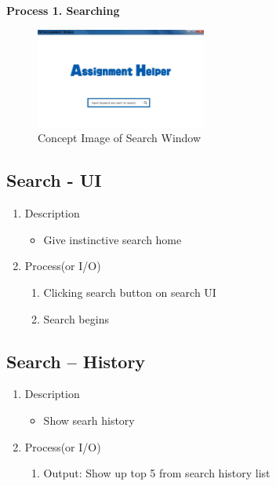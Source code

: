 \documentclass[conference]{IEEEtran}
\begin{document}
\textbf{Process 1. Searching}


\textit{}
\begin{figure}[h]
\centering
\includegraphics[width=0.5\textwidth]{./figures/UI_main.jpg}
\caption{Concept Image of Search Window}
\label{fig_concept_main}
\end{figure}


\subsection{Search - UI}
\begin{enumerate}
\item Description
\begin{itemize}
   \item Give instinctive search home
\end{itemize}
\item Process(or I/O)
  \begin{enumerate}
     \item Clicking search button on search UI
     \item Search begins
  \end{enumerate}
\end{enumerate}
\textit{}

\subsection{Search – History}
\begin{enumerate}
\item Description
\begin{itemize}
   \item Show searh history
\end{itemize}
\item Process(or I/O)
  \begin{enumerate}
     \item Output: Show up top 5 from search history list
  \end{enumerate}
\end{enumerate}
\textit{}
\end{document}
